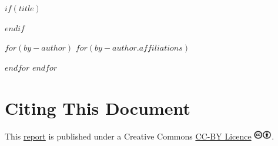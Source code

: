 
$if(title)$
  \par%
$endif$
{}\hfill
{}
        
\begin{flushleft}
  \vspace{0.5cm} 
  $for(by-author)$
    {} 
    $for(by-author.affiliations)$
      \hskip 10pt{} \par%
    $endfor$ 
  $endfor$
\end{flushleft}


\newpage

\thispagestyle{empty}

\section{Citing This Document}

This \href{$citation.url$}{report} is published under a Creative Commons \href{https://creativecommons.org/licenses/by/4.0/}{CC-BY Licence} \includegraphics[height=11pt]{images/cc-by.png}.

